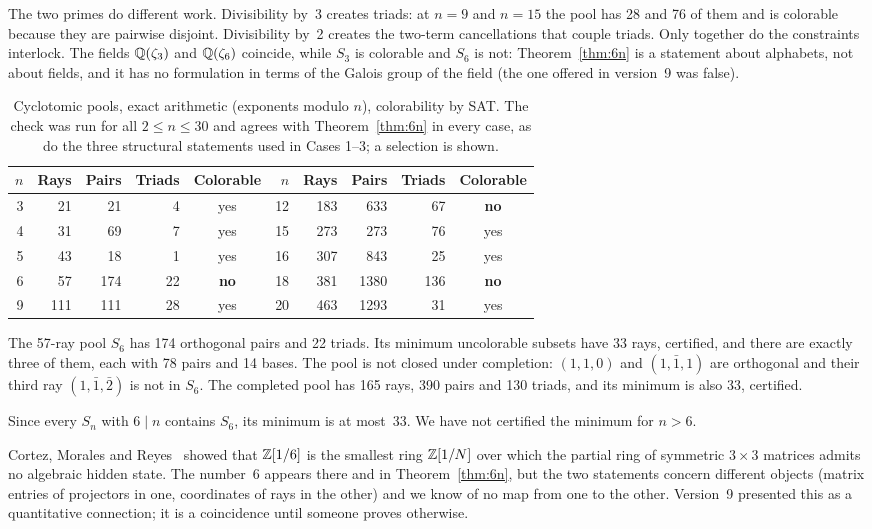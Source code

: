 The two primes do different work.  Divisibility by~3 creates triads: at $n=9$ and $n=15$ the pool
has 28 and 76 of them and is colorable because they are pairwise disjoint.  Divisibility by~2
creates the two-term cancellations that couple triads.  Only together do the constraints
interlock.  The fields $\mathbb{Q}(\zeta_3)$ and $\mathbb{Q}(\zeta_6)$ coincide, while $S_3$ is colorable and
$S_6$ is not: Theorem~\ref{thm:6n} is a statement about alphabets, not about fields, and it has
no formulation in terms of the Galois group of the field (the one offered in version~9 was
false).

\begin{table}[t]
\centering
\caption{Cyclotomic pools, exact arithmetic (exponents modulo $n$), colorability by SAT.  The
check was run for all $2\le n\le30$ and agrees with Theorem~\ref{thm:6n} in every case, as do the
three structural statements used in Cases 1--3; a selection is shown.}
\label{tab:cyc}
\begin{tabular}{rrrrc@{\qquad\qquad}rrrrc}
\toprule
$n$ & Rays & Pairs & Triads & Colorable & $n$ & Rays & Pairs & Triads & Colorable\\
\midrule
3 & 21 & 21 & 4 & yes & 12 & 183 & 633 & 67 & \textbf{no}\\
4 & 31 & 69 & 7 & yes & 15 & 273 & 273 & 76 & yes\\
5 & 43 & 18 & 1 & yes & 16 & 307 & 843 & 25 & yes\\
6 & 57 & 174 & 22 & \textbf{no} & 18 & 381 & 1380 & 136 & \textbf{no}\\
9 & 111 & 111 & 28 & yes & 20 & 463 & 1293 & 31 & yes\\
\bottomrule
\end{tabular}
\end{table}

\begin{fact}\label{fact:eisenstein}
The 57-ray pool $S_6$ has 174 orthogonal pairs and 22 triads.  Its minimum uncolorable subsets
have 33 rays, certified, and there are exactly three of them, each with 78 pairs and 14 bases.
The pool is not closed under completion: $(1,1,0)$ and $(1,\bar1,1)$ are orthogonal and their
third ray $(1,\bar1,\bar2)$ is not in $S_6$.  The completed pool has 165 rays, 390 pairs and 130
triads, and its minimum is also 33, certified.
\end{fact}

Since every $S_n$ with $6\mid n$ contains $S_6$, its minimum is at most~33.  We have not
certified the minimum for $n>6$.

\begin{remark}
Cortez, Morales and Reyes~\cite{CortezMoralesReyes2022} showed that $\mathbb{Z}[1/6]$ is the smallest
ring $\mathbb{Z}[1/N]$ over which the partial ring of symmetric $3\times3$ matrices admits no algebraic
hidden state.  The number~6 appears there
and in Theorem~\ref{thm:6n}, but the two statements concern different objects (matrix entries of
projectors in one, coordinates of rays in the other) and we know of no map from one to the
other.  Version~9 presented this as a quantitative connection; it is a coincidence until someone
proves otherwise.
\end{remark}
